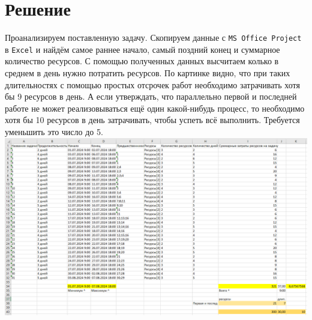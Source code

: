 \documentclass[14pt]{article}
\begin{document}
\section{Решение}
	Проанализируем поставленную задачу.
	Скопируем данные с \texttt{MS Office Project} в \texttt{Excel} и найдём самое раннее начало,
		самый поздний конец и суммарное количество ресурсов.
	С помощью полученных данных высчитаем колько в среднем в день нужно потратить ресурсов.
	По картинке видно,
		что при таких длительностях с помощью простых отсрочек работ необходимо затрачивать хотя бы 9 ресурсов в день.
	А если утверждать, что параллельно первой и последней работе не может реализовываться ещё один какой-нибудь процесс,
		то необходимо хотя бы 10 ресурсов в день затрачивать, чтобы успеть всё выполнить.
	Требуется уменьшить это число до 5.\\
	\includegraphics[width=\textwidth]{../img/init_time_estimation.png}\\
	
\end{document}
